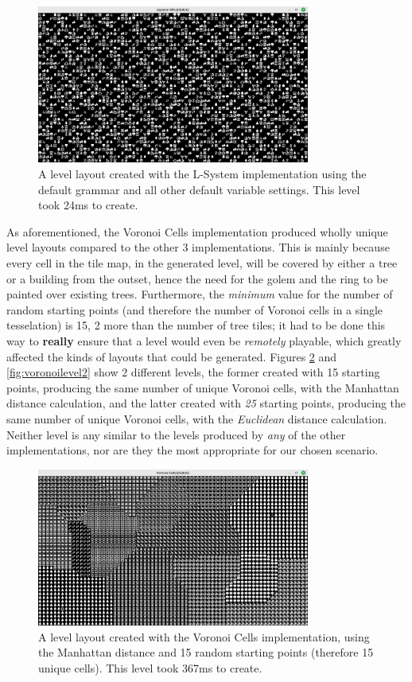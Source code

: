 \begin{figure}[H]
    \centering
    \includegraphics[width=0.8\textwidth]{Images/lsystem2-24ms.png}
    \caption{A level layout created with the L-System implementation using the default grammar and all other default variable settings. This level took 24ms to create.}
    \label{fig:lsys2}
\end{figure}

As aforementioned, the Voronoi Cells implementation produced wholly unique level layouts compared to the other 3 implementations. This is mainly because every cell in the tile map, in the generated level, will be covered by either a tree or a building from the outset, hence the need for the golem and the ring to be painted over existing trees. Furthermore, the \textit{minimum} value for the number of random starting points (and therefore the number of Voronoi cells in a single tesselation) is 15, 2 more than the number of tree tiles; it had to be done this way to \textbf{really} ensure that a level would even be \textit{remotely} playable, which greatly affected the kinds of layouts that could be generated. Figures \ref{fig:voronoilevel1} and \ref{fig:voronoilevel2} show 2 different levels, the former created with 15 starting points, producing the same number of unique Voronoi cells, with the Manhattan distance calculation, and the latter created with \textit{25} starting points, producing the same number of unique Voronoi cells, with the \textit{Euclidean} distance calculation. Neither level is any similar to the levels produced by \textit{any} of the other implementations, nor are they the most appropriate for our chosen scenario. 

\begin{figure}[H]
    \centering
    \includegraphics[width=0.8\textwidth]{Images/voronoi-15-367ms.png}
    \caption{A level layout created with the Voronoi Cells implementation, using the Manhattan distance and 15 random starting points (therefore 15 unique cells). This level took 367ms to create.}
    \label{fig:voronoilevel1}
\end{figure}

